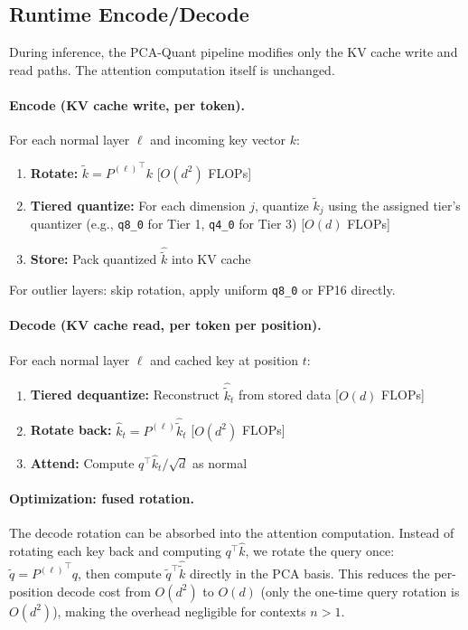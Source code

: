 \subsection{Runtime Encode/Decode}
\label{sec:runtime}

During inference, the PCA-Quant pipeline modifies only the KV cache write and read paths. The attention computation itself is unchanged.

\paragraph{Encode (KV cache write, per token).}
For each normal layer $\ell$ and incoming key vector $k$:
\begin{enumerate}
    \item \textbf{Rotate:} $\tilde{k} = {P^{(\ell)}}^\top k$ \hfill [$O(d^2)$ FLOPs]
    \item \textbf{Tiered quantize:} For each dimension $j$, quantize $\tilde{k}_j$ using the assigned tier's quantizer (e.g., \texttt{q8\_0} for Tier 1, \texttt{q4\_0} for Tier 3) \hfill [$O(d)$ FLOPs]
    \item \textbf{Store:} Pack quantized $\hat{\tilde{k}}$ into KV cache
\end{enumerate}
For outlier layers: skip rotation, apply uniform \texttt{q8\_0} or FP16 directly.

\paragraph{Decode (KV cache read, per token per position).}
For each normal layer $\ell$ and cached key at position $t$:
\begin{enumerate}
    \item \textbf{Tiered dequantize:} Reconstruct $\hat{\tilde{k}}_t$ from stored data \hfill [$O(d)$ FLOPs]
    \item \textbf{Rotate back:} $\hat{k}_t = P^{(\ell)} \hat{\tilde{k}}_t$ \hfill [$O(d^2)$ FLOPs]
    \item \textbf{Attend:} Compute $q^\top \hat{k}_t / \sqrt{d}$ as normal
\end{enumerate}

\paragraph{Optimization: fused rotation.}
The decode rotation can be absorbed into the attention computation. Instead of rotating each key back and computing $q^\top \hat{k}$, we rotate the query once: $\tilde{q} = {P^{(\ell)}}^\top q$, then compute $\tilde{q}^\top \hat{\tilde{k}}$ directly in the PCA basis. This reduces the per-position decode cost from $O(d^2)$ to $O(d)$ (only the one-time query rotation is $O(d^2)$), making the overhead negligible for contexts $n > 1$.

